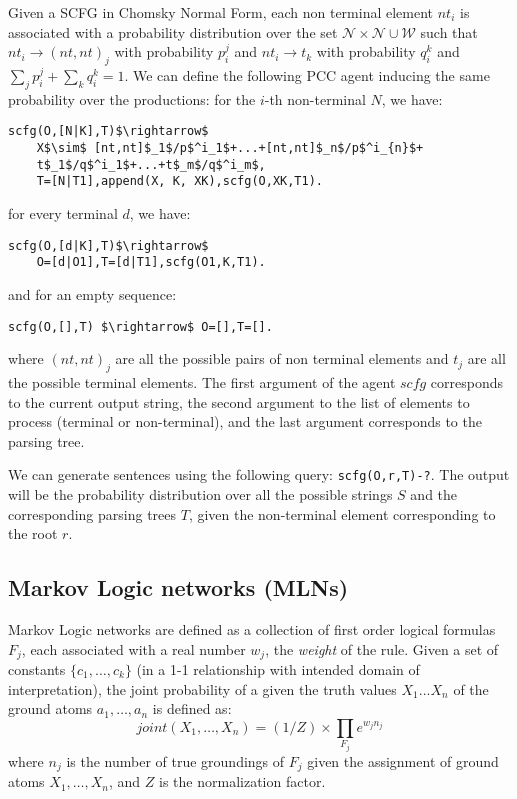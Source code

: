 \documentclass[letterpaper]{article}
\theoremstyle{plain}
\theoremstyle{definition}
\theoremstyle{remark}
\theoremstyle{definition}
\begin{document}
Given a SCFG in Chomsky Normal Form, each non terminal element $nt_i$ is associated with a probability distribution over the set  $\mathcal{N} \times \mathcal{N} \cup \mathcal{W}$ such that
$nt_i \rightarrow (nt,nt)_j$ with probability $p_i^j$ and $nt_i \rightarrow t_k$ with probability $q_i^k$ and $\sum_j p_i^j + \sum_k q_i^k=1$. We can define the following PCC agent inducing the same probability over the productions:
for the $i$-th non-terminal $N$, we have:
\begin{lstlisting}[mathescape=true]
scfg(O,[N|K],T)$\rightarrow$
	X$\sim$ [nt,nt]$_1$/p$^i_1$+...+[nt,nt]$_n$/p$^i_{n}$+
	t$_1$/q$^i_1$+...+t$_m$/q$^i_m$,
	T=[N|T1],append(X, K, XK),scfg(O,XK,T1).
\end{lstlisting}
for every terminal $d$, we have:
\begin{lstlisting}[mathescape=true]
scfg(O,[d|K],T)$\rightarrow$
	O=[d|O1],T=[d|T1],scfg(O1,K,T1).
\end{lstlisting}
and for an empty sequence:
\begin{lstlisting}[mathescape=true]
scfg(O,[],T) $\rightarrow$ O=[],T=[].
\end{lstlisting}
where $(nt,nt)_j$ are all the possible pairs of non terminal elements and $t_j$ are all the possible terminal elements.
The first argument of the agent $scfg$ corresponds to the current output string, the second argument to the list of elements to process (terminal or non-terminal), and the last argument corresponds to the parsing tree.


We can generate sentences using the following query: \lstinline{scfg(O,r,T)-?}. The output will be the probability distribution over all the possible strings $S$ and the corresponding parsing trees $T$, given the non-terminal element corresponding to the root $r$.




\subsection{Markov Logic networks (MLNs)}
Markov Logic networks \cite{markovLogicNetworks} are defined as a collection of first order logical formulas $F_j$, each associated with a real number $w_j$, the {\em weight} of the rule. Given a set of constants $\{c_1,\ldots, c_k\}$ (in a 1-1 relationship with intended domain of interpretation), the joint probability of a given the truth values $X_1 ... X_n$ of the ground atoms $a_1,\ldots, a_n$ is defined as:
$$ joint(X_1,\ldots, X_n)= (1/Z)\times \prod_{F_j} e^{w_j n_j}$$ where $n_j$ is the number of true groundings of $F_j$ given the assignment of ground atoms $X_1, \ldots, X_n$, and $Z$ is the normalization factor.
\end{document}
